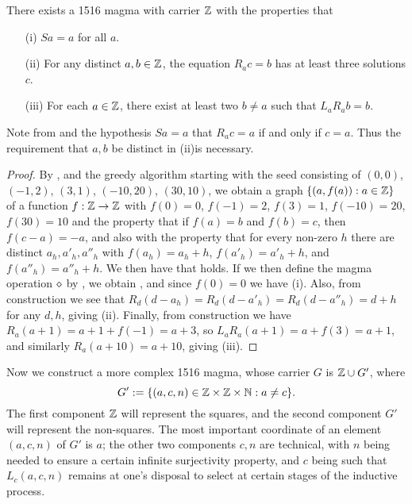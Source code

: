 \begin{corollary}\label{1516-base} There exists a 1516 magma with carrier $\mathbb{Z}$ with the properties that
  \begin{itemize}
    \item[(i)] $Sa=a$ for all $a$.
    \item[(ii)] For any distinct $a,b \in \mathbb{Z}$, the equation $R_a c = b$ has at least three solutions $c$.
    \item[(iii)] For each $a \in \mathbb{Z}$, there exist at least two $b \neq a$ such that $L_a R_a b = b$.
  \end{itemize}
\end{corollary}

Note from  and the hypothesis $Sa=a$ that $R_a c = a$ if and only if $c=a$.  Thus the requirement that $a,b$ be distinct in (ii)is necessary.

\begin{proof}  By ,  and the greedy algorithm starting with the seed consisting of $(0,0)$, $(-1,2)$, $(3,1)$, $(-10,20)$, $(30,10)$, we obtain a graph $\{ (a,f(a)): a \in \mathbb{Z} \}$ of a function $f:\mathbb{Z} \to \mathbb{Z}$ with $f(0)=0$, $f(-1)=2$, $f(3)=1$, $f(-10) = 20$, $f(30)=10$ and the property that if $f(a)=b$ and $f(b)=c$, then $f(c-a)=-a$, and also with the property that for every non-zero $h$ there are distinct $a_h, a'_h, a''_h$ with $f(a_h)=a_h+h$, $f(a'_h) = a'_h+h$, and $f(a''_h) = a''_h+h$.  We then have that  holds.  If we then define the magma operation $\diamond$ by , we obtain , and since $f(0)=0$ we have (i).  Also, from construction we see that $R_d (d - a_h) = R_d (d - a'_h) = R_d (d - a''_h) = d+h$ for any $d,h$, giving (ii).  Finally, from construction we have $R_a (a+1) = a+1+f(-1) = a+3$, so $L_a R_a (a+1) = a + f(3) = a+1$, and similarly $R_a (a+10) = a+10$, giving (iii).
\end{proof}

Now we construct a more complex 1516 magma, whose carrier $G$ is $\mathbb{Z} \cup G'$, where
$$G' := \{ (a,c,n) \in \mathbb{Z} \times \mathbb{Z} \times \mathbb{N} : a \neq c\}.$$
The first component $\mathbb{Z}$ will represent the squares, and the second component $G'$ will represent the non-squares.  The most important coordinate of an element $(a,c,n)$ of $G'$ is $a$; the other two components $c,n$ are technical, with $n$ being needed to ensure a certain infinite surjectivity property, and $c$ being such that $L_c (a,c,n)$ remains at one's disposal to select at certain stages of the inductive process.

